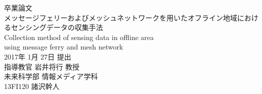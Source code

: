 \thispagestyle{empty}
\begin{center}
\vspace*{-1cm}
\Huge{卒業論文}\\
\vspace{1cm}
\LARGE{メッセージフェリーおよびメッシュネットワークを用いたオフライン地域におけるセンシングデータの収集手法}\\
\vspace{0.2cm}
\large{Collection method of sensing data in offline area\\using message ferry and mesh network}\\
\vspace{2cm}
\Large{2017年 1月 27日 提出}\\
\vspace{2cm}
\LARGE{指導教官 岩井将行 教授}\\
\vspace{1cm}
\LARGE{未来科学部 情報メディア学科}\\
\vspace{1cm}
\huge{13FI120 諸沢幹人}\\
\end{center}
